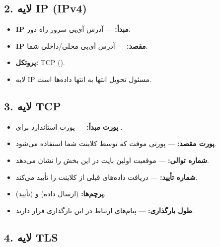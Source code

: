 \subsection*{2. لایه IP (IPv4)}
\begin{itemize}
    \item \textbf{IP مبدأ:}  — آدرس آی‌پی سرور راه دور.
    \item \textbf{IP مقصد:}  — آدرس آی‌پی محلی/داخلی شما.
    \item \textbf{پروتکل:} TCP ().
    \item لایه IP مسئول تحویل انتها به انتها داده‌ها است.
\end{itemize}

\subsection*{3. لایه TCP}
\begin{itemize}
    \item \textbf{پورت مبدأ:}  — پورت استاندارد برای .
    \item \textbf{پورت مقصد:}  — پورتی موقت که توسط کلاینت شما استفاده می‌شود.
    \item \textbf{شماره توالی:}  — موقعیت اولین بایت در این بخش را نشان می‌دهد.
    \item \textbf{شماره تأیید:}  — دریافت داده‌های قبلی از کلاینت را تأیید می‌کند.
    \item \textbf{پرچم‌ها:}  (ارسال داده) و  (تأیید).
    \item \textbf{طول بارگذاری:}  — پیام‌های ارتباط  در این بارگذاری  قرار دارند.
\end{itemize}
\subsection*{4. لایه TLS}
